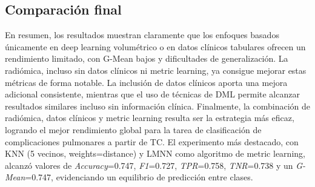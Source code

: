 \subsection{Comparación final}
En resumen, los resultados muestran claramente que los enfoques basados únicamente en deep learning volumétrico o en datos clínicos tabulares ofrecen un rendimiento limitado, con G-Mean bajos y dificultades de generalización. La radiómica, incluso sin datos clínicos ni metric learning, ya consigue mejorar estas métricas de forma notable. La inclusión de datos clínicos aporta una mejora adicional consistente, mientras que el uso de técnicas de DML permite alcanzar resultados similares incluso sin información clínica. Finalmente, la combinación de radiómica, datos clínicos y metric learning resulta ser la estrategia más eficaz, logrando el mejor rendimiento global para la tarea de clasificación de complicaciones pulmonares a partir de TC. El experimento más destacado, con KNN (5 vecinos, weights=distance) y LMNN como algoritmo de metric learning, alcanzó valores de \textit{Accuracy}=0.747, \textit{F1}=0.727, \textit{TPR}=0.758, \textit{TNR}=0.738 y un \textit{G-Mean}=0.747, evidenciando un equilibrio de predicción entre clases.


\endinput
